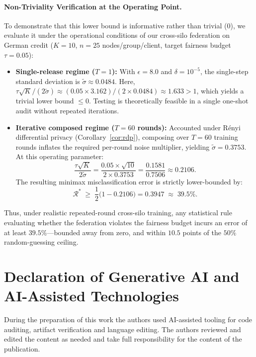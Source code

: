 \documentclass[preprint,12pt]{elsarticle}
\theoremstyle{plain}
\theoremstyle{definition}
\theoremstyle{remark}
\begin{document}
\paragraph{Non-Triviality Verification at the Operating Point.}
To demonstrate that this lower bound is informative rather than trivial ($0$), we evaluate it under the operational conditions of our cross-silo federation on German credit ($K=10$, $n=25$ nodes/group/client, target fairness budget $\tau = 0.05$):
\begin{itemize}
\item \textbf{Single-release regime ($T=1$):} With $\epsilon = 8.0$ and $\delta = 10^{-5}$, the single-step standard deviation is $\tilde\sigma \approx 0.0484$. Here, $\tau\sqrt{K}/(2\tilde\sigma) \approx (0.05 \times 3.162) / (2 \times 0.0484) \approx 1.633 > 1$, which yields a trivial lower bound $\le 0$. Testing is theoretically feasible in a single one-shot audit without repeated iterations.
\item \textbf{Iterative composed regime ($T=60$ rounds):} Accounted under R\'enyi differential privacy (Corollary~\ref{cor:rdp}), composing over $T=60$ training rounds inflates the required per-round noise multiplier, yielding $\tilde\sigma = 0.3753$. At this operating parameter:
\begin{equation}
\frac{\tau\sqrt{K}}{2\tilde\sigma} = \frac{0.05 \times \sqrt{10}}{2 \times 0.3753} = \frac{0.1581}{0.7506} \approx 0.2106.
\end{equation}
The resulting minimax misclassification error is strictly lower-bounded by:
\begin{equation}
\mathcal{R}^* \;\ge\; \frac{1}{2}\big(1 - 0.2106\big) = 0.3947 \;\approx\; 39.5\%.
\end{equation}
\end{itemize}
Thus, under realistic repeated-round cross-silo training, any statistical rule evaluating whether the federation violates the fairness budget incurs an error of at least $39.5\%$---bounded away from zero, and within $10.5$ points of the $50\%$ random-guessing ceiling.

\section*{Declaration of Generative AI and AI-Assisted Technologies}
During the preparation of this work the authors used AI-assisted tooling for code auditing, artifact verification and language editing. The authors reviewed and edited the content as needed and take full responsibility for the content of the publication.
\end{document}
